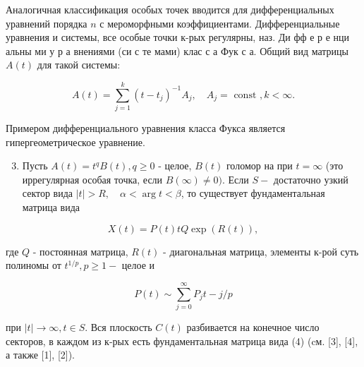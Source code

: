 \documentclass[10pt]{article}
\begin{document}
Аналогичная классификация особых точек вводится для дифференциальных уравнений порядка $n$ с мероморфными коэффициентами. Дифференциальные уравнения и системы, все особые точки к-рых регулярны, наз. Ди фф е р е нци альны ми у р а внениями (си с те мами) клас с а Фук с а. Общий вид матрицы $A(t)$ для такой системы:



\[

A(t)=\sum_{j=1}^{k}\left(t-t_{j}\right)^{-1} A_{j}, \quad A_{j}=\text { const }, k<\infty .

\]



Примером дифференциального уравнения класса Фукса является гипергеометрическое уравнение.



\begin{enumerate}

  \setcounter{enumi}{2}

  \item Пусть $A(t)=t^{q} B(t), q \geqslant 0$ - целое, $B(t)$ голомор на при $t=\infty$ (это иррегулярная особая точка, если $B(\infty) \neq 0)$. Если $S-$ достаточно узкий сектор вида $|t|>R, \quad \alpha<\arg t<\beta$, то существует фундаментальная матрица вида

\end{enumerate}



\[

X(t)=P(t) t Q \exp (R(t)),

\]



где $Q$ - постоянная матрица, $R(t)$ - диагональная матрица, элементы к-рой суть полиномы от $t^{1 / p}, p \geqslant 1-$ целое и



\[

P(t) \sim \sum_{j=0}^{\infty} P_{j} t-j / p

\]



при $|t| \rightarrow \infty, t \in S$. Вся плоскость $C(t)$ разбивается на конечное число секторов, в каждом из к-рых есть фундаментальная матрица вида (4) (cм. [3], [4], а также [1], [2]).
\end{document}
